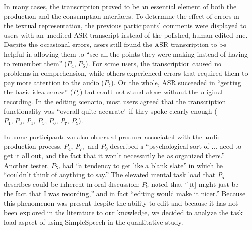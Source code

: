\documentclass{sigchi}
\begin{document}
In many cases, the transcription proved to be an essential element of both the production and the consumption interfaces. 
To determine the effect of errors in the textual representation, the previous participants' comments were displayed to users with an unedited ASR transcript instead of the polished, human-edited one. 
Despite the occasional errors, users still found the ASR transcription to be helpful in allowing them to ``see all the points they were making instead of having to remember them'' ($P_4,\,P_6$). 
For some users, the transcription caused no problems in comprehension, while others experienced errors that required them to pay more attention to the audio ($P_8$). 
On the whole, ASR succeeded in ``getting the basic idea across'' ($P_3$) but could not stand alone without the original recording. 
In the editing scenario, most users agreed that the transcription functionality was ``overall quite accurate'' if they spoke clearly enough ($P_1,\,P_3,\,P_4,\,P_5,\,P_6,\,P_7,\,P_9$). 

In some participants we also observed pressure associated with the audio production process. $P_4,\,P_7,$ and $P_9$ described a ``psychological sort of ... need to get it all out, and the fact that it won't necessarily be as organized there.'' 
Another tester, $P_5$, had ``a tendency to get like a blank slate'' in which he ``couldn't think of anything to say.'' 
The elevated mental task load that $P_5$ describes could be inherent in oral discussion; $P_9$ noted that ``[it] might just be the fact that I was recording,'' and in fact ``editing would make it nicer.'' 
Because this phenomenon was present despite the ability to edit and because it has not been explored in the literature to our knowledge, we decided to analyze the task load aspect of using SimpleSpeech in the quantitative study.
\end{document}
